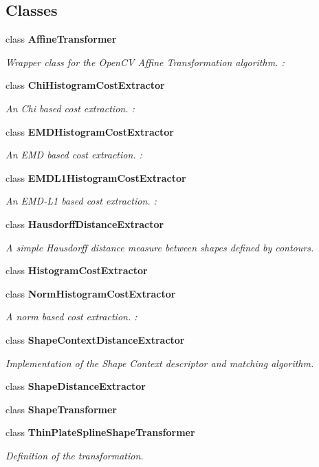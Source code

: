 \subsection*{Classes}
\begin{DoxyCompactItemize}
\item 
class {\bfseries Affine\+Transformer}
\begin{DoxyCompactList}\small\item\em Wrapper class for the Open\+CV Affine Transformation algorithm. \+: \end{DoxyCompactList}\item 
class {\bfseries Chi\+Histogram\+Cost\+Extractor}
\begin{DoxyCompactList}\small\item\em An Chi based cost extraction. \+: \end{DoxyCompactList}\item 
class {\bfseries E\+M\+D\+Histogram\+Cost\+Extractor}
\begin{DoxyCompactList}\small\item\em An E\+MD based cost extraction. \+: \end{DoxyCompactList}\item 
class {\bfseries E\+M\+D\+L1\+Histogram\+Cost\+Extractor}
\begin{DoxyCompactList}\small\item\em An E\+M\+D-\/\+L1 based cost extraction. \+: \end{DoxyCompactList}\item 
class {\bfseries Hausdorff\+Distance\+Extractor}
\begin{DoxyCompactList}\small\item\em A simple Hausdorff distance measure between shapes defined by contours. \end{DoxyCompactList}\item 
class {\bfseries Histogram\+Cost\+Extractor}
\item 
class {\bfseries Norm\+Histogram\+Cost\+Extractor}
\begin{DoxyCompactList}\small\item\em A norm based cost extraction. \+: \end{DoxyCompactList}\item 
class {\bfseries Shape\+Context\+Distance\+Extractor}
\begin{DoxyCompactList}\small\item\em Implementation of the Shape Context descriptor and matching algorithm. \end{DoxyCompactList}\item 
class {\bfseries Shape\+Distance\+Extractor}
\item 
class {\bfseries Shape\+Transformer}
\item 
class {\bfseries Thin\+Plate\+Spline\+Shape\+Transformer}
\begin{DoxyCompactList}\small\item\em Definition of the transformation. \end{DoxyCompactList}\end{DoxyCompactItemize}
